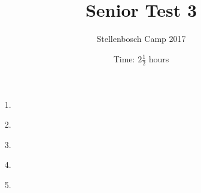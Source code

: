 \documentclass[12pt]{article}
\title{Senior Test 3}
\author{Stellenbosch Camp 2017}
\date{Time: $2\frac{1}{2}$ hours}
\begin{document}
 \maketitle

\begin{enumerate}

\item[1.] %


\item[2.] %


\item[3.] %


\item[4.] %


\item[5.] %


\end{enumerate}
\end{document}
